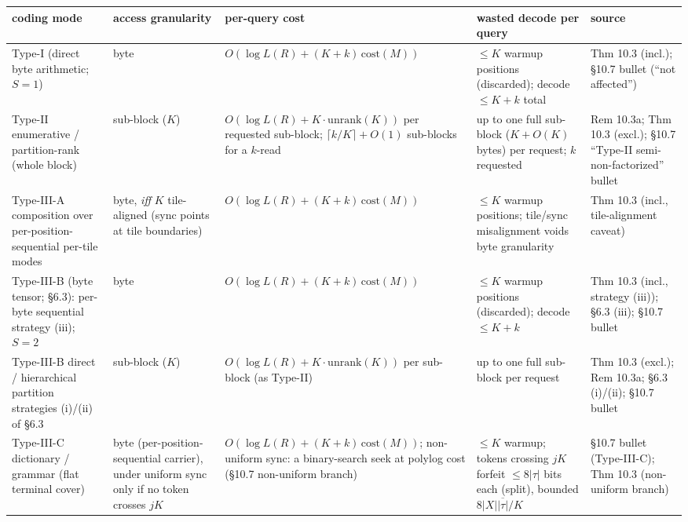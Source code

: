 \documentclass[
]{article}
\begin{document}
\begingroup\footnotesize\sloppy
\setlength{\tabcolsep}{4pt}
\noindent\begin{tabular}{@{}p{2.5cm}p{1.9cm}p{3.0cm}p{2.6cm}p{2.4cm}@{}}
\hline
\textbf{coding mode} & \textbf{access granularity} &
\textbf{per-query cost} & \textbf{wasted decode per query} &
\textbf{source}\\
\hline
Type-I (direct byte arithmetic; $S\!=\!1$)
& byte
& $O(\log L(R) + (K\!+\!k)\,\mathrm{cost}(M))$
& $\le K$ warmup positions (discarded); decode $\le K\!+\!k$ total
& Thm 10.3 (incl.); §10.7 bullet (``not affected'')\\
Type-II enumerative / partition-rank (whole block)
& sub-block ($K$)
& $O(\log L(R) + K\!\cdot\!\mathrm{unrank}(K))$ per requested sub-block; $\lceil k/K\rceil\!+\!O(1)$ sub-blocks for a $k$-read
& up to one full sub-block ($K\!+\!O(K)$ bytes) per request; $k$ requested
& Rem 10.3a; Thm 10.3 (excl.); §10.7 ``Type-II semi-non-factorized'' bullet\\
Type-III-A composition over per-position-sequential per-tile modes
& byte, \emph{iff} $K$ tile-aligned (sync points at tile boundaries)
& $O(\log L(R) + (K\!+\!k)\,\mathrm{cost}(M))$
& $\le K$ warmup positions; tile/sync misalignment voids byte granularity
& Thm 10.3 (incl., tile-alignment caveat)\\
Type-III-B (byte tensor; §6.3): per-byte sequential strategy (iii); $S\!=\!2$
& byte
& $O(\log L(R) + (K\!+\!k)\,\mathrm{cost}(M))$
& $\le K$ warmup positions (discarded); decode $\le K\!+\!k$
& Thm 10.3 (incl., strategy (iii)); §6.3 (iii); §10.7 bullet\\
Type-III-B direct / hierarchical partition strategies (i)/(ii) of §6.3
& sub-block ($K$)
& $O(\log L(R) + K\!\cdot\!\mathrm{unrank}(K))$ per sub-block (as Type-II)
& up to one full sub-block per request
& Thm 10.3 (excl.); Rem 10.3a; §6.3 (i)/(ii); §10.7 bullet\\
Type-III-C dictionary / grammar (flat terminal cover)
& byte (per-position-sequential carrier), under uniform sync only if no token crosses $jK$
& $O(\log L(R) + (K\!+\!k)\,\mathrm{cost}(M))$; non-uniform sync: a binary-search seek at polylog cost (\S10.7 non-uniform branch)
& $\le K$ warmup; tokens crossing $jK$ forfeit $\le 8|\tau|$ bits each (split), bounded $8|X|\overline{|\tau|}/K$
& §10.7 bullet (Type-III-C); Thm 10.3 (non-uniform branch)\\
\hline
\end{tabular}
\par\endgroup
\end{document}
